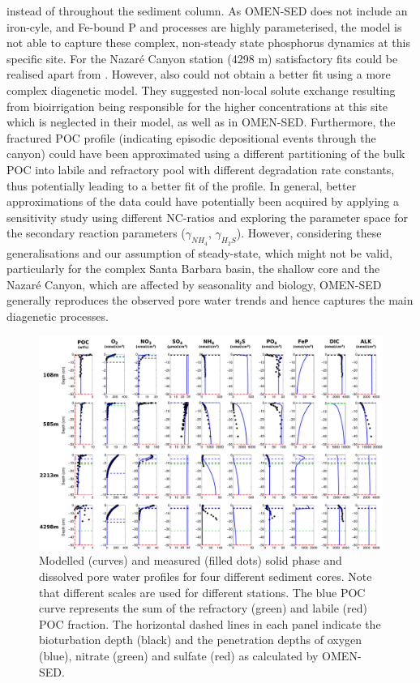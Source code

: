\documentclass[gmd, manuscript]{copernicus}
\begin{document}
instead of throughout the sediment column. %
As OMEN-SED does not include an iron-cyle, and Fe-bound P and  processes are highly parameterised, the model is not able to capture these complex, non-steady state phosphorus 
dynamics at this specific site. 
For the Nazar\'e Canyon station (4298 m) satisfactory fits could be realised apart from . However, also \citet{epping_oxidation_2002} could not obtain a better fit 
using a more complex diagenetic model. They suggested non-local solute exchange resulting from bioirrigation being responsible for the higher  concentrations at this site which is neglected in their model, as well as in 
OMEN-SED. Furthermore, the fractured POC profile (indicating episodic depositional events through the canyon) could have been approximated using a different partitioning of the bulk POC into 
labile and refractory pool with different degradation rate constants, thus potentially leading to a better fit of the  profile.  
In general, better approximations of the data could have potentially been acquired by applying a sensitivity study using different NC-ratios \citep[e.g.][report different ratios from Redfield stoichiometry]{epping_oxidation_2002} 
and exploring the parameter space for the secondary reaction parameters ($\gamma_{NH_4}$, $\gamma_{H_2S}$). 
However, considering these generalisations and our assumption of steady-state, which might not be valid, particularly for the complex Santa Barbara basin, the shallow core and the Nazar\'e Canyon, which are affected by seasonality 
and biology, OMEN-SED generally reproduces the observed pore water trends and hence captures the main diagenetic processes. 

\begin{figure}
	\includegraphics[width=1.0\textwidth]{figures/Profiles/0_ALL_PROFILES_COMBINED_1503.pdf}
	\caption{Modelled (curves) and measured (filled dots) solid phase and dissolved pore water profiles for four different sediment cores. Note that different 
	scales are used for different stations. The blue POC curve represents the sum of the refractory (green) and labile (red) POC fraction. The horizontal dashed lines in each panel indicate the 
	bioturbation depth (black) and the penetration depths of oxygen (blue), nitrate (green) and sulfate (red) as calculated by OMEN-SED.}
	\label{fig:Sediment_profiles}
\end{figure}
\end{document}
